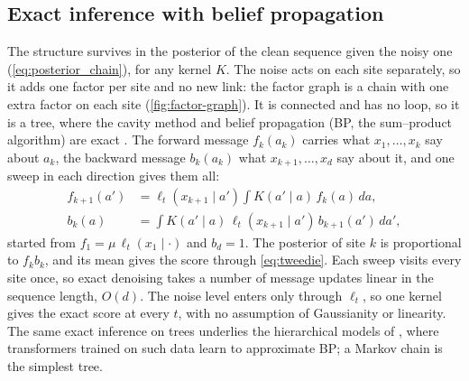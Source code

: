 \documentclass{article}
\begin{document}
\subsection{Exact inference with belief propagation}
\label{sec:tree}
The structure survives in the posterior of the clean sequence given the noisy one (\cref{eq:posterior_chain}), for any
kernel $K$. The noise acts on each site separately, so it adds one factor per site and no new link: the factor graph is a
chain with one extra factor on each site (\cref{fig:factor-graph}). It is connected and has no loop, so it is a tree,
where the cavity method and belief propagation (BP, the sum--product algorithm) are exact
\cite{mezard2001bethe,mezard2006reconstruction,mezard2009information,pearl1988probabilistic,kschischang2001factor,yedidia2003understanding}.
The forward message $f_k(a_k)$ carries what $x_1,\ldots,x_k$ say about $a_k$, the backward message $b_k(a_k)$ what
$x_{k+1},\ldots,x_d$ say about it, and one sweep in each direction gives them all:
\begin{align}
    f_{k+1}(a')&=\ell_t(x_{k+1}\mid a')\int K(a'\mid a)\,f_k(a)\,da,\nonumber\\
    b_k(a)&=\int K(a'\mid a)\,\ell_t(x_{k+1}\mid a')\,b_{k+1}(a')\,da',
    \label{eq:bp}
\end{align}
started from $f_1=\mu\,\ell_t(x_1\mid\cdot)$ and $b_d=1$. The posterior of site $k$ is proportional to $f_kb_k$, and
its mean gives the score through \cref{eq:tweedie}. Each sweep visits every site once, so exact denoising takes a number
of message updates linear in the sequence length, $O(d)$. The noise level enters only through $\ell_t$, so one kernel gives the exact score at every
$t$, with no assumption of Gaussianity or linearity. The same exact inference on trees underlies the hierarchical models
of \cite{garnierbrun2024transformers}, where transformers trained on such data learn to approximate BP; a Markov chain
is the simplest tree.
\end{document}

